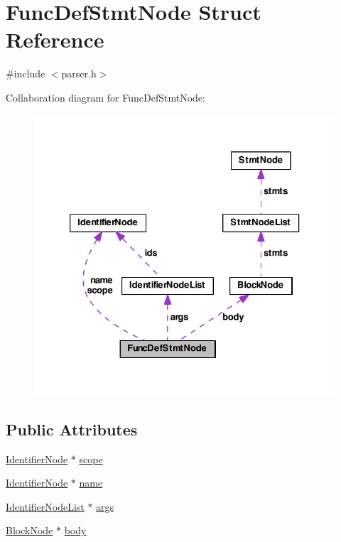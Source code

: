 \hypertarget{struct_func_def_stmt_node}{\section{Func\-Def\-Stmt\-Node Struct Reference}
\label{struct_func_def_stmt_node}
}


{\ttfamily \#include $<$parser.\-h$>$}



Collaboration diagram for Func\-Def\-Stmt\-Node\-:
\nopagebreak
\begin{figure}[H]
\begin{center}
\leavevmode
\includegraphics[width=329pt]{struct_func_def_stmt_node__coll__graph}
\end{center}
\end{figure}
\subsection*{Public Attributes}
\begin{DoxyCompactItemize}
\item 
\hyperlink{struct_identifier_node}{Identifier\-Node} $\ast$ \hyperlink{struct_func_def_stmt_node_a545e8a727dbe8786ab90afa0a4608d68}{scope}
\item 
\hyperlink{struct_identifier_node}{Identifier\-Node} $\ast$ \hyperlink{struct_func_def_stmt_node_ab047936127219724532e25ba6890265a}{name}
\item 
\hyperlink{struct_identifier_node_list}{Identifier\-Node\-List} $\ast$ \hyperlink{struct_func_def_stmt_node_a2a9f4d580b7252e5576873d2252a187a}{args}
\item 
\hyperlink{struct_block_node}{Block\-Node} $\ast$ \hyperlink{struct_func_def_stmt_node_a9e50b6a41f7abe43b433fe4fd714b002}{body}
\end{DoxyCompactItemize}


